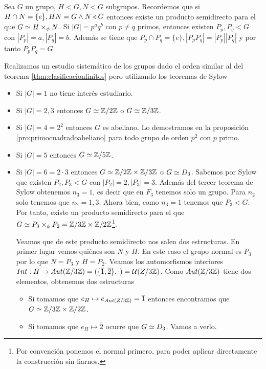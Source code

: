 \begin{ej}
	\label{ej:clasificacionsylow}
	Sea $G$ un grupo, $H < G, N < G$ subgrupos. Recordemos que si $H\cap N = \{e\}, HN = G \land N \mathbin{\triangleleft} G$ entonces existe un producto semidirecto para el que $G \simeq H \times_\phi N$. Si $|G| = p^a q^b$ con $p \neq q$ primos, entonces existen $P_p, P_q < G$ con $|P_p| = a, |P_q| = b$. Además se tiene que $P_p \cap P_q = \{e\}, |P_pP_q| = |P_p||P_q|$ y por tanto $P_pP_q = G$.
	
	Realizamos un estudio sistemático de los grupos dado el orden similar al del teorema \ref{thm:clasificacionfinitos} pero utilizando los teoremas de Sylow
	\begin{itemize}
		\item Si $|G| = 1$ no tiene interés estudiarlo.
		\item Si $|G| = 2, 3$ entonces $G \simeq \mathbb{Z}/2\mathbb{Z}$ o $G\simeq \mathbb{Z}/3\mathbb{Z}$.
		\item Si $|G| = 4 = 2^2$ entonces $G$ es abeliano. Lo demostramos en la proposición \ref{pro:primocuadradoabeliano} para todo grupo de orden $p^2$ con $p$ primo.
		\item Si $|G| = 5$ entonces $G \simeq \mathbb{Z}/5\mathbb{Z}$.
		\item Si $|G| = 6 = 2\cdot 3$ entonces $G \simeq \mathbb{Z}/2\mathbb{Z} \times \mathbb{Z}/3\mathbb{Z}$ o $G \simeq D_3$. Sabemos por Sylow que existen $P_2, P_3 < G$ con $|P_2| = 2, |P_3| = 3$. Además del tercer teorema de Sylow obtenemos $n_3 = 1$, es decir que en $F_3$ tenemos solo un grupo. Para $n_2$ solo tenemos que $n_2 = 1, 3$. Ahora bien, como $n_3 = 1$ tenemos que $P_3 < G$. Por tanto, existe un producto semidirecto para el que $G \simeq P_3 \times_\phi P_2  = \mathbb{Z}/3\mathbb{Z} \times \mathbb{Z}/2\mathbb{Z}$\footnote{Por convención ponemos el normal primero, para poder aplicar directamente la construcción sin liarnos.}.
		
		Veamos que de este producto semidirecto nos salen dos estructuras. En primer lugar vemos quiénes son $N$ y $H$. En este caso el grupo normal es $P_3$ por lo que $N = P_3$ y $H = P_2$. Veamos los automorfismos interiores $Int:H \to Aut(\mathbb{Z}/3\mathbb{Z}) = (\{\overline{1}, \overline{2}\}, \cdot) = \mathcal{U}(Z/3\mathbb{Z})$. Como $Aut(\mathbb{Z}/3\mathbb{Z})$ tiene dos elementos, obtenemos dos estructuras
		\begin{itemize}
			\item Si tomamos que $e_H \mapsto e_{Aut(Z/3\mathbb{Z})} = \overline{1}$ entonces encontramos que $G \simeq \mathbb{Z}/3\mathbb{Z} \times \mathbb{Z}/2\mathbb{Z}$.
			\item Si tomamos que $e_H \mapsto \overline{2}$ ocurre que $G \simeq D_3$. Vamos a verlo.
			

\end{itemize}
\end{itemize}
\end{ej}
